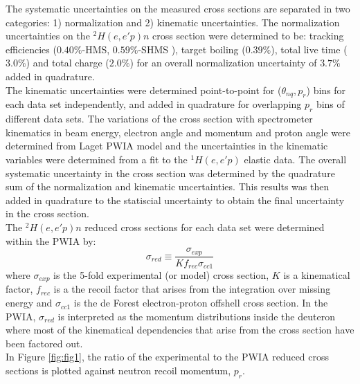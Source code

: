 \indent The systematic uncertainties on the measured cross sections are separated in two categories: 1) normalization and 2) kinematic uncertainties. The normalization uncertainties on
the  $^{2}H(e,e'p)n$ cross section were determined to be: tracking efficiencies ($0.40 \%$-HMS, $0.59 \%$-SHMS ), target boiling ($0.39 \%$), total live time ($3.0 \%$) and total charge ($2.0\%$)
for an overall normalization uncertainty of $3.7 \%$ added in quadrature. \\
\indent The kinematic uncertainties were determined point-to-point for ($\theta_{nq}, p_{r}$) bins for each data set independently, and added in quadrature for overlapping $p_{r}$ bins
of different data sets. The variations of the cross section with spectrometer kinematics in beam energy, electron angle and momentum and proton angle were determined from Laget PWIA model and the uncertainties
in the kinematic variables were determined from a fit to the $^{1}H(e,e'p)$ elastic data.
The overall systematic uncertainty in the cross section was determined by the quadrature sum of the normalization and kinematic uncertainties. This results was then added in quadrature
to the statiscial uncertainty to obtain the final uncertainty in the cross section. \\
\indent The $^{2}H(e,e'p)n$ reduced cross sections for each data set were determined within the PWIA by:
\begin{equation}
\sigma_{red} \equiv \frac{\sigma_{exp}}{Kf_{rec}\sigma_{cc1}}
\label{eq:1}
\end{equation}
where $\sigma_{exp}$ is the 5-fold experimental (or model) cross section, $K$ is a kinematical factor, $f_{rec}$ is a the recoil factor that arises from the
integration over missing energy and $\sigma_{cc1}$ is the de Forest\cite{DEFOREST1983} electron-proton offshell cross section.
In the PWIA, $\sigma_{red}$ is interpreted as the momentum distributions inside the deuteron where most of the kinematical dependencies that arise from the
cross section have been factored out. \\
\indent In Figure \ref{fig:fig1}, the ratio of the experimental to the PWIA reduced cross sections is plotted against neutron recoil momentum, $p_{r}$. 

